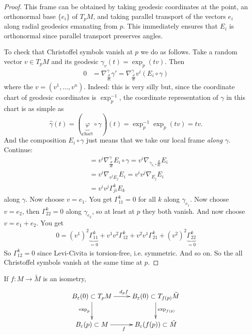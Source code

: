 \begin{proof}
This frame can be obtained by taking geodesic coordinates at the point, an
orthonormal base $\{e_i\}$ of $T_pM$, and taking parallel transport of the
vectors $e_i$ along radial geodesics emanating from $p$. This immediately
ensures that $E_i$ is orthonormal since parallel transport preserves angles.

To check that Christoffel symbols vanish at $p$ we do as follows. 
Take a random vector $v \in T_pM$ and its geodesic
$\gamma_v(t)=\operatorname{exp}_p(tv)$. Then
\begin{align*}
0&=\nabla_{\frac{d}{dt}}^{\gamma}\gamma'
=\nabla^{\gamma}_{\frac{d}{dt}}v^i(E_i\circ \gamma)
\end{align*}
where the $v=(v^1,\ldots,v^n)$. Indeed: this is very silly but, since the 
coordinate chart of geodesic coordinates is $\operatorname{exp}_p^{-1}$, 
the coordinate representation of $\gamma$ in this chart is as simple as
$$
\hat{\gamma}(t)=(\underbrace{\varphi}_{\text{chart}} \circ \gamma)(t)
=\operatorname{exp}_p^{-1} \operatorname{exp}_p(tv)=tv.
$$
And the composition $E_i \circ \gamma$ just means that we take our local 
frame \textit{along $\gamma$}. Continue:
\begin{align*}
&=v^i\nabla^{\gamma}_{\frac{d}{dt}}E_i\circ\gamma
=v^i\nabla_{\gamma_{v,*} \frac{d}{dt}}E_i\\
&=v^i\nabla_{v^jE_j}E_i=v^iv^j\nabla_{E_j}E_i\\&
=v^iv^j\Gamma_{ji}^kE_k
\end{align*}
along $\gamma$. Now choose $v=e_1$. You get $\Gamma_{11}^k=0$ for all $k$ along $\gamma_{e_1}$. Now choose $v=e_2$, then $\Gamma_{22}^k=0$ along $\gamma_{e_2}$, so at least at $p$ they both vanish. And now choose $v=e_1+e_2$. You get
\begin{align*}
0=(v^1)^2 \underbrace{\Gamma_{1 1}^k}_{=0}
+v^1v^2 \Gamma_{1 2}^k+v^2v^1\Gamma_{2 1}^k
+(v^2)^2\underbrace{\Gamma_{2 2}^k}_{=0}
\end{align*}
So $\Gamma_{12}^k=0$ since Levi-Civita is torsion-free, i.e. symmetric. 
And so on. So the all Christoffel symbols vanish at the same time at $p$.
\end{proof}

\begin{proposition}
\label{proposition-naturality-of-exponential}
If $f:M\to \tilde{M}$ is an isometry,
$$
\xymatrix{
B_\varepsilon(0)\subset T_pM \ar[r]^{d_p f} \ar[d]_{\text{exp}_p} &
B_\varepsilon(0)\subset T_{f(p)}\tilde{M} \ar[d]^{\text{exp}_{f(p)}} \\
B_\varepsilon(p)\subset M \ar[r]_{f} & B_\varepsilon(f(p))\subset \tilde{M}
}
$$
\end{proposition}

